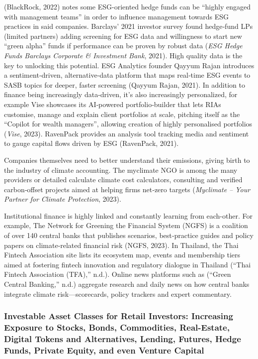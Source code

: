 \documentclass[
  12pt,
  letterpaper,
  DIV=11,
  numbers=noendperiod]{scrartcl}
\begin{document}
(BlackRock, 2022) notes some ESG-oriented hedge funds can be ``highly
engaged with management teams'' in order to influence management towards
ESG practices in said companies. Barclays' 2021 investor survey found
hedge‑fund LPs (limited partners) adding screening for ESG data and
willingness to start new ``green alpha'' funds if performance can be
proven by robust data (\emph{{ESG} Hedge Funds {\textbar} {Barclays
Corporate} \& {Investment Bank}}, 2021). High quality data is the key to
unlocking this potential. ESG Analytics founder Qayyum Rajan introduces
a sentiment‑driven, alternative‑data platform that maps real‑time ESG
events to SASB topics for deeper, faster screening (Qayyum Rajan, 2021).
In addition to finance being increasingly data-driven, it's also
increasingly personalized, for example Vise showcases its AI‑powered
portfolio‑builder that lets RIAs customise, manage and explain client
portfolios at scale, pitching itself as the ``Copilot for wealth
managers'', allowing creation of highly personalised portfolios
(\emph{Vise}, 2023). RavenPack provides an analysis tool tracking media
and sentiment to gauge capital flows driven by ESG (RavenPack, 2021).

Companies themselves need to better understand their emissions, giving
birth to the industry of climate accounting. The myclimate NGO is among
the many providers or detailed calculate climate cost calculators,
consulting and verified carbon‑offset projects aimed at helping firms
net‑zero targets (\emph{Myclimate -- Your Partner for Climate
Protection}, 2023).

Institutional finance is highly linked and constantly learning from
each-other. For example, The Network for Greening the Financial System
(NGFS) is a coalition of over 140 central banks that publishes
scenarios, best‑practice guides and policy papers on climate‑related
financial risk (NGFS, 2023). In Thailand, the Thai Fintech Association
site lists its ecosystem map, events and membership tiers aimed at
fostering fintech innovation and regulatory dialogue in Thailand
({``Thai {Fintech Association} ({TFA}),''} n.d.). Online news platforms
such as ({``Green {Central Banking},''} n.d.) aggregate research and
daily news on how central banks integrate climate risk---scorecards,
policy trackers and expert commentary.

\subsubsection{Investable Asset Classes for Retail Investors: Increasing
Exposure to Stocks, Bonds, Commodities, Real-Estate, Digital Tokens and
Alternatives, Lending, Futures, Hedge Funds, Private Equity, and even
Venture
Capital}\label{investable-asset-classes-for-retail-investors-increasing-exposure-to-stocks-bonds-commodities-real-estate-digital-tokens-and-alternatives-lending-futures-hedge-funds-private-equity-and-even-venture-capital}
\end{document}
